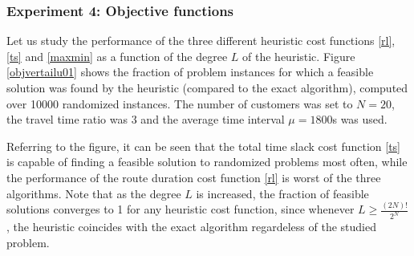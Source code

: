 \documentclass[dissertation,draft*]{aaltoseries}
\begin{document}
\subsubsection{Experiment 4: Objective functions}
Let us study the performance of the three different heuristic cost functions \eqref{rl}, \eqref{ts} and \eqref{maxmin}
as a function of the degree $L$ of the heuristic.
Figure \ref{objvertailu01} shows the fraction of problem instances for which a feasible solution was 
found by the heuristic (compared to the exact algorithm), computed over 10000
randomized instances. 
The number of customers was set to $N=20$, the travel time ratio
was $3$ and the average time interval $\mu = 1800$s was used.

Referring to the figure, it can be seen that the total time slack cost function \eqref{ts} is capable of finding
a feasible solution to randomized problems most often, while the performance of the route duration cost
function \eqref{rl} is worst of the three algorithms. Note that as the degree $L$ is increased, 
the fraction of feasible solutions converges to 1 for any heuristic cost function, since whenever $L \geq \frac{(2N)!}{2^N}$,
the heuristic coincides with the exact algorithm regardeless of the studied problem.



% 
% 
% 
\end{document}
